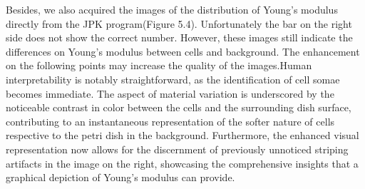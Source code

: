 \documentclass[a4paper,english,12pt,bibliography=totoc]{scrreprt}
\begin{document}

    



Besides, we also acquired the images of the distribution of Young's modulus directly from the JPK program(Figure 5.4). Unfortunately the bar on the right side does not show the correct number. However, these images still indicate the differences on Young's modulus between cells and background. 
The enhancement on the following points may increase the quality of the images.Human interpretability is notably straightforward, as the identification of cell somae becomes immediate.
The aspect of material variation is underscored by the noticeable contrast in color between the cells and the surrounding dish surface, contributing to an instantaneous representation of the softer nature of cells respective to the petri dish in the background.
Furthermore, the enhanced visual representation now allows for the discernment of previously unnoticed striping artifacts in the image on the right, showcasing the comprehensive insights that a graphical depiction of Young's modulus can provide.
\end{document}
